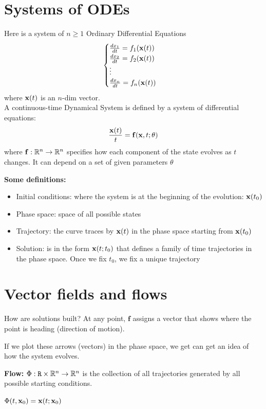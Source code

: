 \documentclass{report}
\begin{document}
\section*{Systems of ODEs}

Here is a system of $n \ge 1$ Ordinary Differential Equations
\[
\begin{cases}
\frac{dx_1}{dt} = f_1(\mathbf{x}(t))\\
\frac{dx_2}{dt} = f_2(\mathbf{x}(t))\\
\vdots \\ 
\frac{dx_n}{dt} = f_n(\mathbf{x}(t))
\end{cases}
\]
where $\mathbf{x}(t)$ is an $n$-dim vector.
\\

A continuous-time Dynamical System is defined by a system of differential equations:
\[
\frac{\mathbf{x}(t)}{t} = \mathbf{f}(\mathbf{x}, t; \theta)
\]
where $\mathbf{f}: \mathbb{R}^n \to \mathbb{R}^n$ specifies how each component of the state evolves as $t$ changes.
It can depend on a set of given parameters $\theta$

\textbf{Some definitions:}

\begin{itemize}
    \item Initial conditions: where the system is at the beginning of the evolution:
    $\mathbf{x}(t_0)$
    \item Phase space: space of all possible states 
    \item Trajectory: the curve traces by $\mathbf{x}(t)$ in the phase space starting from $\mathbf{x}(t_0)$
    \item Solution: is in the form $\mathbf{x}(t; t_0)$ that defines a family of time trajectories 
    in the phase space. Once we fix $t_0$, we fix a unique trajectory
\end{itemize}

\section*{Vector fields and flows}
How are solutions built? At any point, $\mathbf{f}$ assigns a vector 
that shows where the point is heading (direction of motion).

If we plot these arrows (vectors) in the phase space, we get can 
get an idea of how the system evolves. 

\textbf{Flow: } $\Phi: \mathtt{R} \times \mathbb{R}^n \to \mathbb{R}^n$ is the collection of 
all trajectories generated by all possible starting conditions. 

$\Phi(t, \mathbf{x}_0) = \mathbf{x}(t; \mathbf{x}_0)$
\\
\end{document}
